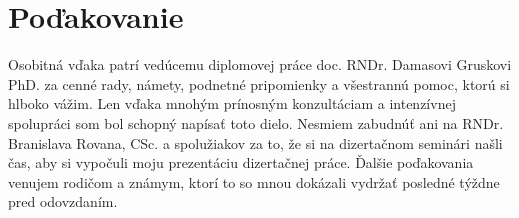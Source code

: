 \chapter*{Poďakovanie}
Osobitná vďaka patrí vedúcemu diplomovej práce doc. RNDr. Damasovi Gruskovi PhD. za cenné rady, námety, podnetné pripomienky a všestrannú pomoc, ktorú si hlboko vážim. Len vďaka mnohým prínosným konzultáciam a intenzívnej spolupráci som bol schopný napísať toto dielo. Nesmiem zabudnúť ani na RNDr. Branislava Rovana, CSc. a spolužiakov za to, že si na dizertačnom seminári našli čas, aby si vypočuli moju prezentáciu dizertačnej práce. Ďalšie poďakovania venujem rodičom a známym, ktorí to so mnou dokázali vydržať posledné týždne pred odovzdaním.
